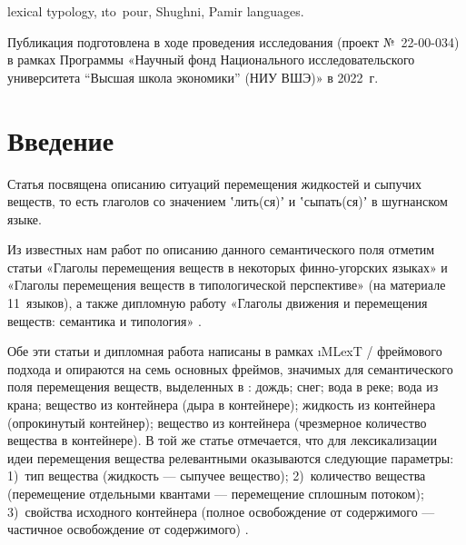 \begin{eng-keywords}
lexical typology, \i{{\sc to~pour}}, Shughni, Pamir languages.
\end{eng-keywords}

\begin{acknowledgements}
Публикация подготовлена в ходе проведения исследования (проект №~22-00-034) в рамках Программы «Научный фонд Национального исследовательского университета “Высшая школа экономики” (НИУ ВШЭ)» в 2022~г.
\label{pour-acknow}
\end{acknowledgements}

\begin{initialprint}
\end{initialprint}

\section{Введение} \label{pour-intro}

Статья посвящена описанию ситуаций перемещения жидкостей и сыпучих веществ, то есть глаголов со значением ʽлить(ся)ʼ и ʽсыпать(ся)ʼ в шугнанском языке.

Из известных нам работ по описанию данного семантического поля отметим статьи «Глаголы перемещения веществ в некоторых финно-угорских языках» \parencite{kashkin2020} и «Глаголы перемещения веществ в типологической перспективе» \parencite{dzedzic2016} (на материале 11~языков), а также дипломную работу «Глаголы движения и перемещения веществ: семантика и типология» \parencite{dzedzic2017}.

Обе эти статьи и дипломная работа написаны в рамках \i{MLexT} / фреймового подхода \parencite{rakhilina_reznikova2013} и опираются на семь основных фреймов, значимых для семантического поля перемещения веществ, выделенных в \parencite{dzedzic2016}: дождь; снег; вода в реке; вода из крана; вещество из контейнера (дыра в контейнере); жидкость из контейнера (опрокинутый контейнер); вещество из контейнера (чрезмерное количество вещества в контейнере). В той же статье отмечается, что для лексикализации идеи перемещения вещества релевантными оказываются следующие параметры: 1)~тип вещества (жидкость — сыпучее вещество); 2)~количество вещества (перемещение отдельными квантами — перемещение сплошным потоком); 3)~свойства исходного контейнера (полное освобождение от содержимого — частичное освобождение от содержимого) \parencite[29–30]{dzedzic2016}.

